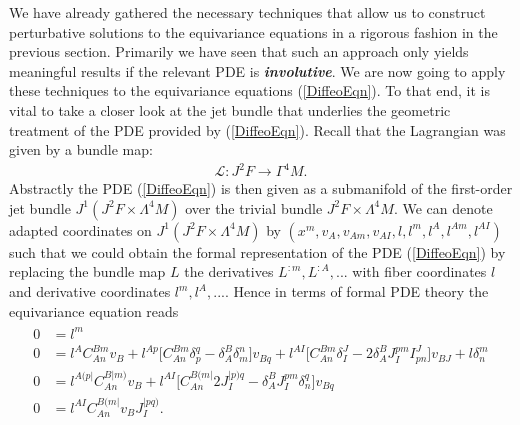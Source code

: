 \documentclass[a4paper,12pt, DIV=14, BCOR=5mm, twoside, headsepline, numbers=noenddot]{scrbook}
\begin{document}
We have already gathered the necessary techniques that allow us to construct perturbative solutions to the equivariance equations in a rigorous fashion in the previous section. Primarily we have seen that such an approach only yields meaningful results if the relevant PDE is \textit{\textbf{involutive}}. We are now going to apply these techniques to the equivariance equations (\ref{DiffeoEqn}). To that end, it is vital to take a closer look at the jet bundle that underlies the geometric treatment of the PDE provided by (\ref{DiffeoEqn}). Recall that the Lagrangian was given by a bundle map:
\begin{align}
\mathcal{L} : J^2F \longrightarrow \Gamma^4M.
\end{align}
Abstractly the PDE (\ref{DiffeoEqn}) is then given as a submanifold of the first-order jet bundle $J^1(J^2F \times \Lambda^4M)$ over the trivial bundle $J^2F \times \Lambda^4M$. 
We can denote adapted coordinates on $J^1(J^2F \times \Lambda^4M)$ by $(x^m,v_A,v_{Am},v_{AI},l,l^{m},l^{A},l^{Am},l^{AI})$ such that we could obtain the formal representation of the PDE (\ref{DiffeoEqn}) by replacing the bundle map $L$ the derivatives $L^{:m},L^{:A},...$ with fiber coordinates $l$ and derivative coordinates $l^m,l^A,...$. Hence in terms of formal PDE theory the equivariance equation reads 
\begin{align}\label{DiffeoEqnFormal}
\begin{aligned}
    0 &= l^{m} \\
    0 &= l^{A} C_{An}^{Bm} v_B + l^{Ap} \bigl[ C_{An}^{Bm} \delta_p^q - \delta_A^B \delta_m^n \bigr] v_{Bq} + l^{AI} \bigl[ C_{An}^{Bm} \delta_I^J - 2 \delta_A^B J_I^{pm} I^J_{pn}  \bigr] v_{BJ} + l \delta^m_n \\
    0 &= l^{A(p\vert}C_{An}^{B \vert m)} v_B + l^{ AI} \bigl[ C_{An}^{B(m\vert} 2 J_I^{\vert p) q} - \delta^B_A J_I ^{pm} \delta_n^q \bigr] v_{Bq} \\
    0 &= l^{AI} C_{An}^{B(m\vert} v_B J_I^{\vert p q )}.
    \end{aligned}
\end{align}
\end{document}
